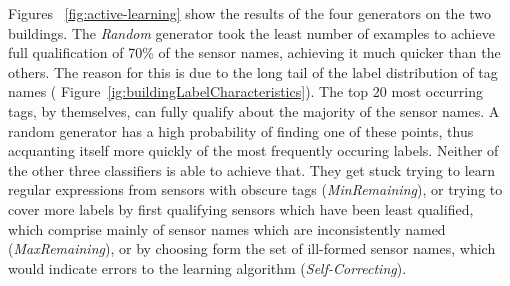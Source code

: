 Figures ~\ref{fig:active-learning} show the results of the four generators on the two buildings. The \emph{Random} generator took the least number of examples to achieve full qualification of 70\% of the sensor names, achieving it much quicker than the others. The reason for this is due to the long tail of the label distribution of tag names (  Figure~\ref{ig:buildingLabelCharacteristics}). The top 20 most occurring tags, by themselves, can fully qualify about the majority of the sensor names. A random generator has a high probability of finding one of these points, thus acquanting itself more quickly of the most frequently occuring labels. Neither of the other three classifiers is able to achieve that. They get stuck trying to learn regular expressions from sensors with obscure tags (\emph{MinRemaining}), or trying to cover more labels by first qualifying sensors which have been least qualified, which comprise mainly of sensor names which are inconsistently named (\emph{MaxRemaining}), or by choosing form the set of ill-formed sensor names, which would indicate errors to the learning algorithm (\emph{Self-Correcting}).


